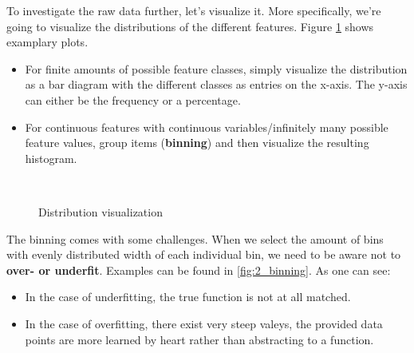 To investigate the raw data further, let's visualize it. More specifically, we're going to visualize the distributions of the different features. Figure \ref{fig:2_distr_visualization} shows examplary plots.
\begin{itemize}
  \item For finite amounts of possible feature classes, simply visualize the distribution as a bar diagram with the different classes as entries on the x-axis. The y-axis can either be the frequency or a percentage.
  \item For continuous features with continuous variables/infinitely many possible feature values, group items (\textbf{binning}) and then visualize the resulting histogram.
\end{itemize}

\begin{figure}[H]
  \centering

  \\\vspace*{0.5cm}

  \caption{Distribution visualization}
  \label{fig:2_distr_visualization}
\end{figure}

The binning comes with some challenges. When we select the amount of bins with evenly distributed width of each individual bin, we need to be aware not to \textbf{over- or underfit}. Examples can be found in \ref{fig:2_binning}. As one can see:
\begin{itemize}
  \item In the case of underfitting, the true function is not at all matched.
  \item In the case of overfitting, there exist very steep valeys, the provided data points are more learned by heart rather than abstracting to a function.
\end{itemize}

